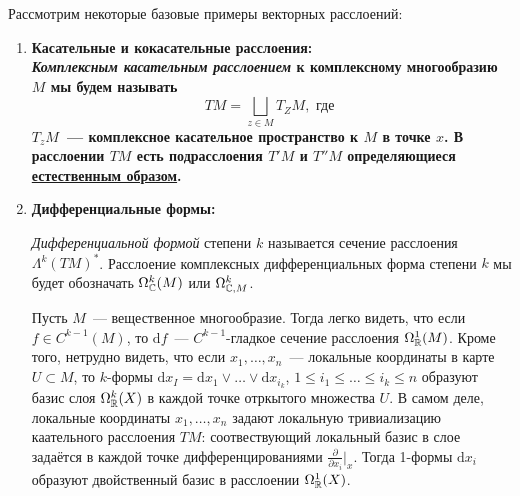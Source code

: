     \begin{example}
        Рассмотрим некоторые базовые примеры векторных расслоений: 
        \begin{enumerate}
            \item \bf{Касательные и кокасательные расслоения:}\\
            \emph{Комплексным касательным расслоением} к комплексному многообразию $M$ мы будем называть 
            \[
                TM = \bigsqcup_{z \in M}T_{Z}M, \text{ где } 
            \]
            $T_{z}M$~--- комплексное касательное пространство к $M$ в точке $x$.     
            В расслоении $TM$ есть подрасслоения $T'M$ и $T''M$ определяющиеся \hyperlink{complex_tungent_space}{естественным образом}.
            
            \item \bf{Дифференциальные формы:}
            \begin{definition} 
                \emph{Дифференциальной формой} степени $k$ называется сечение расслоения $\Lambda^k (TM)^*$. Расслоение комплексных дифференциальных форма степени $k$ мы будет обозначать $\Omega^k_{\mathbb{C}}(M)$ или $\Omega^k_{\mathbb{C}, M}$. 

                Пусть $M$~--- вещественное многообразие. Тогда легко видеть, что если $f \in C^{k - 1}(M)$, то $\mathrm{d}f$~--- $C^{k - 1}$-гладкое сечение расслоения $\Omega^1_{\mathbb{R}}(M)$. Кроме того, нетрудно видеть, что если $x_1, \ldots, x_n$~--- локальные координаты в карте $U \subset M$, то $k$-формы $\mathrm{d}x_{I} = \mathrm{d}x_1 \vee \ldots \vee \mathrm{d}x_{i_k}$, $1 \le i_1 \le \ldots \le i_k \le n$ образуют базис слоя $\Omega^k_{\mathbb{R}}(X)$ в каждой точке отркытого множества $U$. В самом деле, локальные координаты $x_1, \ldots, x_n$ задают локальную тривиализацию каательного расслоения $TM$: соотвествующий локальный базис в слое задаётся в каждой точке дифференцированиями $\frac{\partial}{\partial x_i}\bigg\vert_{x}$. Тогда 1-формы $\mathrm{d} x_i$ образуют двойственный базис в расслоении $\Omega^1_{\mathbb{R}}(X)$.
            \end{definition}
        \end{enumerate}
    \end{example}